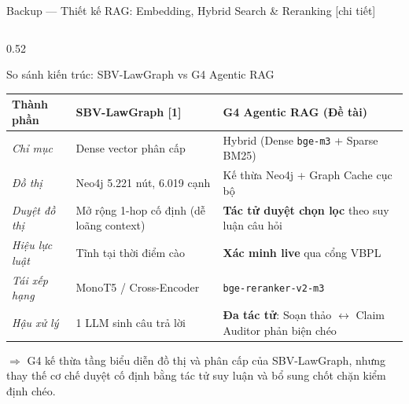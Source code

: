 \documentclass[aspectratio=169,10pt]{beamer}
\begin{document}
\begin{frame}{Backup --- Thiết kế RAG: Embedding, Hybrid Search \& Reranking [chi tiết]}
\begin{columns}[T]
\begin{column}{0.52\textwidth}
\begin{block}{\small So sánh kiến trúc: SBV-LawGraph vs G4 Agentic RAG}
\scriptsize
\begin{tabular}{@{}p{1.9cm}p{2.3cm}p{2.6cm}@{}}
\toprule
\textbf{Thành phần} & \textbf{SBV-LawGraph [1]} & \textbf{G4 Agentic RAG (Đề tài)} \\ \midrule
\textit{Chỉ mục} & Dense vector phân cấp & Hybrid (Dense \texttt{bge-m3} + Sparse BM25) \\
\textit{Đồ thị} & Neo4j 5.221 nút, 6.019 cạnh & Kế thừa Neo4j + Graph Cache cục bộ \\
\textit{Duyệt đồ thị} & Mở rộng 1-hop cố định (dễ loãng context) & \textbf{Tác tử duyệt chọn lọc} theo suy luận câu hỏi \\
\textit{Hiệu lực luật} & Tĩnh tại thời điểm cào & \textbf{Xác minh live} qua cổng VBPL \\
\textit{Tái xếp hạng} & MonoT5 / Cross-Encoder & \texttt{bge-reranker-v2-m3} \\
\textit{Hậu xử lý} & 1 LLM sinh câu trả lời & \textbf{Đa tác tử}: Soạn thảo $\leftrightarrow$ Claim Auditor phản biện chéo \\
\bottomrule
\end{tabular}
\end{block}
{\tiny $\Rightarrow$ G4 kế thừa tầng biểu diễn đồ thị và phân cấp của SBV-LawGraph, nhưng thay thế cơ chế duyệt cố định bằng tác tử suy luận và bổ sung chốt chặn kiểm định chéo.}
\end{column}
\end{columns}
\end{frame}
\end{document}
